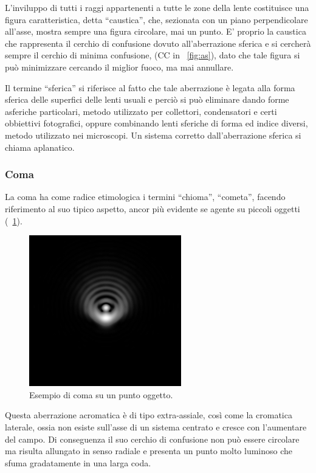 L'inviluppo di tutti i raggi appartenenti a tutte le zone della lente costituisce una figura caratteristica, detta ``caustica'', che, sezionata con un piano perpendicolare all'asse, mostra sempre una figura circolare, mai un punto.
E' proprio la caustica che rappresenta il cerchio di confusione dovuto all'aberrazione sferica e si cercherà sempre il cerchio di minima confusione, (CC in \figurename~\ref{fig:as}), dato che tale figura si può minimizzare cercando il miglior fuoco, ma mai annullare.

Il termine ``sferica'' si riferisce al fatto che tale aberrazione è legata alla forma sferica delle superfici delle lenti usuali e perciò si può eliminare dando forme asferiche particolari, metodo utilizzato per collettori, condensatori e certi obbiettivi fotografici, oppure combinando lenti sferiche di forma ed indice diversi, metodo utilizzato nei microscopi. 
Un sistema corretto dall'aberrazione sferica si chiama aplanatico.

\subsubsection{Coma}
La coma ha come radice etimologica i termini ``chioma'', ``cometa'', facendo riferimento al suo tipico aspetto, ancor più evidente se agente su piccoli oggetti (\figurename~\ref{fig:coma}).

\begin{figure}
 \centering
 \includegraphics[scale=.45]{img/CAP2coma.jpg}
 \caption{\small{Esempio di coma su un punto oggetto.}}
 \label{fig:coma}
\end{figure}

Questa aberrazione acromatica è di tipo extra-assiale, così come la cromatica laterale, ossia non esiste sull'asse di un sistema centrato e cresce con l'aumentare del campo. 
Di conseguenza il suo cerchio di confusione non può essere circolare ma risulta allungato in senso radiale e presenta un punto molto luminoso che sfuma gradatamente in una larga coda. 

